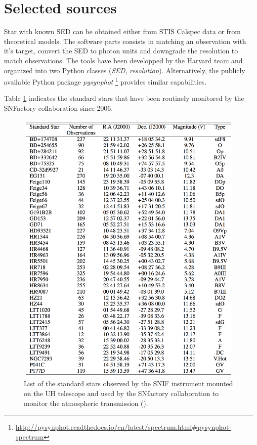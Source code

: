 \documentclass[onecolumn]{aa}
\begin{document}
\section{Selected sources}


Star with known SED can be obtained either from STIS Calspec data or from theoretical models.
The software parts consists in matching an observation with it's target, convert the SED to photon units and downgrade the resolution to match observations. The tools have been developped by the Harvard team and organized into two Python classes ({\it SED}, {\it resolution}). Alternatively, the publicly available Python package {\it pysynphot} \footnote{\url{http://pysynphot.readthedocs.io/en/latest/spectrum.html\#pysynphot-spectrum}} provides similar capabilities.


Table \ref{fig:im2} indicates the standard stars that have been routinely monitored by the SNFactory collaboration since 2006.

\begin{figure}
\centering
\includegraphics[width=0.6\linewidth]{snf_target.png}
\caption{ List of the standard stars observed by the SNIF instrument mounted on the UH telescope and used by the SNfactory collaboration to monitor the atmospheric transmission (\citealt{buton}).
\label{fig:im2}
}
\end{figure}











\end{document}
